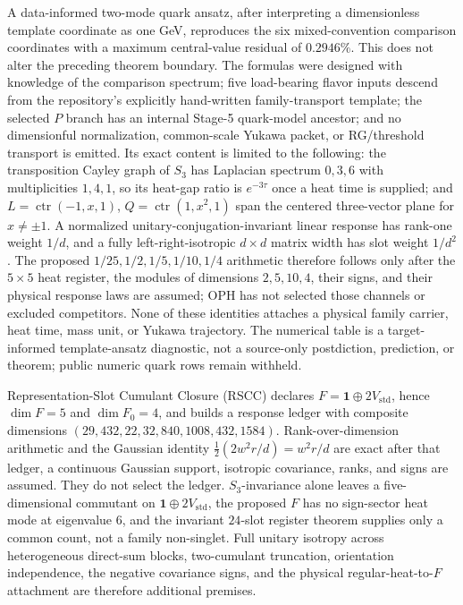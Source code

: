 \documentclass[11pt]{article}
\begin{document}
A data-informed two-mode quark ansatz, after interpreting a
dimensionless template coordinate as one GeV, reproduces the six mixed-convention comparison
coordinates with a maximum central-value residual of \(0.2946\%\).  This does not alter the
preceding theorem boundary.  The formulas were designed with knowledge of the comparison
spectrum; five load-bearing flavor inputs descend from the repository's explicitly hand-written
family-transport template; the selected \(P\) branch has an internal Stage-5 quark-model ancestor;
and no dimensionful normalization, common-scale Yukawa packet, or RG/threshold transport is
emitted. Its exact content is limited to the following: the transposition Cayley graph of
\(S_3\) has Laplacian spectrum \(0,3,6\) with multiplicities \(1,4,1\), so its heat-gap ratio is
\(e^{-3\tau}\) once a heat time is supplied; and
\(L=\operatorname{ctr}(-1,x,1)\), \(Q=\operatorname{ctr}(1,x^2,1)\) span the centered
three-vector plane for \(x\ne\pm1\).  A normalized unitary-conjugation-invariant linear response
has rank-one weight \(1/d\), and a fully left-right-isotropic \(d\times d\) matrix width has slot
weight \(1/d^2\).  The proposed \(1/25,1/2,1/5,1/10,1/4\) arithmetic therefore follows only after
the \(5\times5\) heat register, the modules of dimensions \(2,5,10,4\), their signs, and their
physical response laws are assumed; OPH has not selected those channels or excluded competitors.
None of these identities attaches a physical family carrier, heat time, mass unit, or Yukawa
trajectory. The numerical table is a target-informed template-ansatz diagnostic,
not a source-only postdiction, prediction,
or theorem; public numeric quark rows remain withheld.

Representation-Slot Cumulant Closure (RSCC) declares
\(F=\mathbf 1\oplus2V_{\mathrm{std}}\), hence \(\dim F=5\) and
\(\dim F_0=4\), and builds a response ledger with composite dimensions
\((29,432,22,32,840,1008,432,1584)\).  Rank-over-dimension arithmetic and the
Gaussian identity
\(\frac12(2w^2r/d)=w^2r/d\) are exact after that ledger, a continuous Gaussian
support, isotropic covariance, ranks, and signs are assumed.  They do not select the ledger.
\(S_3\)-invariance alone leaves a five-dimensional commutant on
\(\mathbf 1\oplus2V_{\mathrm{std}}\), the proposed \(F\) has no sign-sector heat mode at
eigenvalue \(6\), and the invariant \(24\)-slot register theorem supplies only a common
count, not a family non-singlet.  Full unitary isotropy across heterogeneous direct-sum blocks,
two-cumulant truncation, orientation independence, the negative covariance signs, and the physical
regular-heat-to-\(F\) attachment are therefore additional premises.
\end{document}
